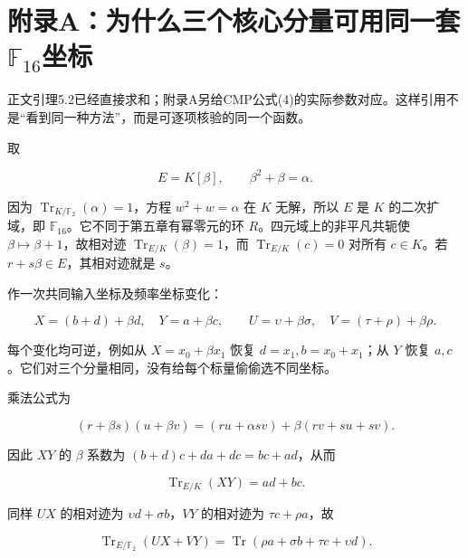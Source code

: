 \documentclass[UTF8,fontset=fandol,zihao=-4,openany,oneside]{ctexbook}
\begin{document}
\section{附录A：为什么三个核心分量可用同一套\texorpdfstring{\(\mathbb F_{16}\)}{mathbb F16}坐标}


正文引理5.2已经直接求和；附录A另给CMP公式(4)的实际参数对应。这样引用不是“看到同一种方法”，而是可逐项核验的同一个函数。



取



\[
E=K[\beta],\qquad\beta^2+\beta=\alpha.
\]



因为 \(\operatorname{Tr}_{K/\mathbb F_2}(\alpha)=1\)，方程 \(w^2+w=\alpha\) 在 \(K\) 无解，所以 \(E\) 是 \(K\) 的二次扩域，即 \(\mathbb F_{16}\)。它不同于第五章有幂零元的环 \(R\)。四元域上的非平凡共轭使 \(\beta\mapsto\beta+1\)，故相对迹 \(\operatorname{Tr}_{E/K}(\beta)=1\)，而 \(\operatorname{Tr}_{E/K}(c)=0\) 对所有 \(c\in K\)。若 \(r+s\beta\in E\)，其相对迹就是 \(s\)。



作一次共同输入坐标及频率坐标变化：



\[
X=(b+d)+\beta d,\quad Y=a+\beta c,
\qquad U=\upsilon+\beta\sigma,
\quad V=(\tau+\rho)+\beta\rho.
\]



每个变化均可逆，例如从 \(X=x_0+\beta x_1\) 恢复 \(d=x_1,b=x_0+x_1\)；从 \(Y\) 恢复 \(a,c\)。它们对三个分量相同，没有给每个标量偷偷选不同坐标。



乘法公式为



\[
(r+\beta s)(u+\beta v)
=(ru+\alpha sv)+\beta(rv+su+sv).
\]



因此 \(XY\) 的 \(\beta\) 系数为 \((b+d)c+da+dc=bc+ad\)，从而



\[
\operatorname{Tr}_{E/K}(XY)=ad+bc.
\]



同样 \(UX\) 的相对迹为 \(\upsilon d+\sigma b\)，\(VY\) 的相对迹为 \(\tau c+\rho a\)，故



\[
\operatorname{Tr}_{E/\mathbb F_2}(UX+VY)
=\operatorname{Tr}(\rho a+\sigma b+\tau c+\upsilon d).
\]
\end{document}
